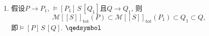\documentclass[UTF8]{ctexart}
\begin{document}
\begin{enumerate}
    \vspace{1pt}\hspace{2.17em}
    所以任意的$\sigma\models P$在$\mathbf{while}\,\,B\,\,
    \mathbf{do}\,\,S\,\,\mathbf{od}$下终止, 同时(在PW一节)已证
    \[
        \models\{P\land B\}\,S\,\{P\}\quad\implies\quad
        \models\{P\}\,\mathbf{while}\,\,B\,\,
        \mathbf{do}\,\,S\,\,\mathbf{od}\,\{P\land\neg\,B\},
    \]
    所以$[\![\,\mathbf{while}\,\,B\,\,\mathbf{do}\,\,S\,\,\mathbf{od}\,]\!]
    (\sigma)\models P\land\neg\,B$, 即$\models[P]\,\mathbf{while}\,\,B\,\,
    \mathbf{do}\,\,S\,\,\mathbf{od}\,[P\land\neg\,B]$.

    \item 假设$P\to P_1$, $\models[P_1]\,S\,[Q_1]$且$Q\to Q_1$, 则
    \[
        \mathcal{M}[\![S]\!]_{\mathrm{tot}}(P)\subset
        \mathcal{M}[\![S]\!]_{\mathrm{tot}}(P_1)\subset Q_1\subset Q,
    \]
    即$\models[P]\,S\,[Q]$. \hfill $\qedsymbol$
\end{enumerate}
\end{document}
